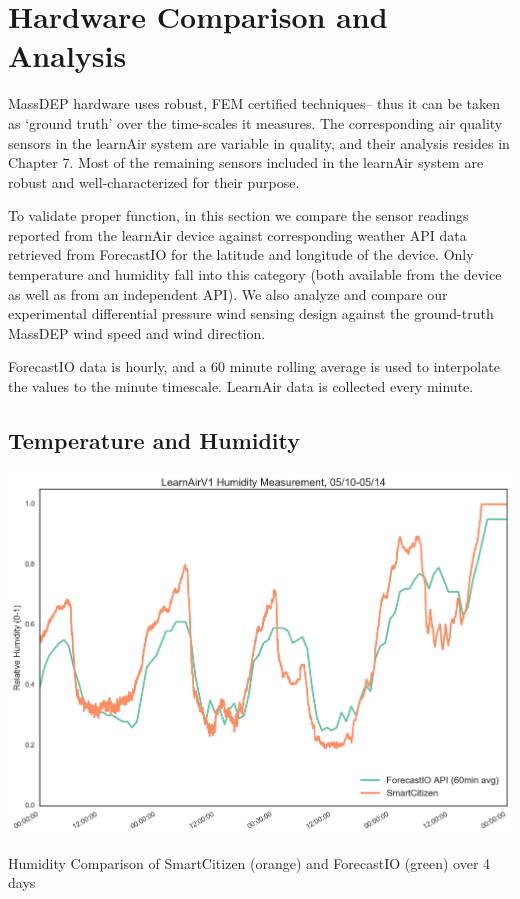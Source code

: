 \clearpage

\FloatBarrier
\section{Hardware Comparison and Analysis}
\FloatBarrier

MassDEP hardware uses robust, FEM certified techniques-- thus it can be taken as `ground truth' over the time-scales it measures.  The corresponding air quality sensors in the learnAir system are variable in quality, and their analysis resides in Chapter 7.    Most of the remaining sensors included in the learnAir system are robust and well-characterized for their purpose.

To validate proper function, in this section we compare the sensor readings reported from the learnAir device against corresponding weather API data retrieved from ForecastIO for the latitude and longitude of the device.  Only temperature and humidity fall into this category (both available from the device as well as from an independent API).  We also analyze and compare our experimental differential pressure wind sensing design against the ground-truth MassDEP wind speed and wind direction.

ForecastIO data is hourly, and a 60 minute rolling average is used to interpolate the values to the minute timescale.  LearnAir data is collected every minute.

\subsection{Temperature and Humidity}
\FloatBarrier

\begin{marginfigure}[5cm]
 	\includegraphics[width=\textwidth]{figs/humidity_zoomed}               
 	 \caption{Humidity Comparison of SmartCitizen (orange) and ForecastIO (green) over 4 days}
  	\label{fig:humidity_zoomed}
\end{marginfigure}

